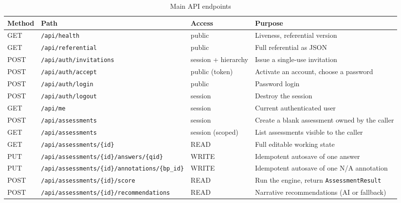 \begin{table}[ht!]
  \centering
  \begin{tabular}{@{}p{1.3cm}p{5.6cm}p{2.1cm}p{4.0cm}@{}}
    \toprule
    Method & Path & Access & Purpose \\
    \midrule
    GET & \texttt{/\allowbreak api/\allowbreak health} & public & Liveness, referential version \\
    GET & \texttt{/\allowbreak api/\allowbreak referential} & public & Full referential as JSON \\
    POST & \texttt{/\allowbreak api/\allowbreak auth/\allowbreak invitations} & session + hierarchy & Issue a single-use invitation \\
    POST & \texttt{/\allowbreak api/\allowbreak auth/\allowbreak accept} & public (token) & Activate an account, choose a password \\
    POST & \texttt{/\allowbreak api/\allowbreak auth/\allowbreak login} & public & Password login \\
    POST & \texttt{/\allowbreak api/\allowbreak auth/\allowbreak logout} & session & Destroy the session \\
    GET & \texttt{/\allowbreak api/\allowbreak me} & session & Current authenticated user \\
    POST & \texttt{/\allowbreak api/\allowbreak assessments} & session & Create a blank assessment owned by the caller \\
    GET & \texttt{/\allowbreak api/\allowbreak assessments} & session (scoped) & List assessments visible to the caller \\
    GET & \texttt{/\allowbreak api/\allowbreak assessments/\allowbreak \{id\}} & READ & Full editable working state \\
    PUT & \texttt{/\allowbreak api/\allowbreak assessments/\allowbreak \{id\}/\allowbreak answers/\allowbreak \{qid\}} & WRITE & Idempotent autosave of one answer \\
    PUT & \texttt{/\allowbreak api/\allowbreak assessments/\allowbreak \{id\}/\allowbreak annotations/\allowbreak \{bp\_\allowbreak id\}} & WRITE & Idempotent autosave of one N/A annotation \\
    POST & \texttt{/\allowbreak api/\allowbreak assessments/\allowbreak \{id\}/\allowbreak score} & READ & Run the engine, return \texttt{Assessment\allowbreak Result} \\
    POST & \texttt{/\allowbreak api/\allowbreak assessments/\allowbreak \{id\}/\allowbreak recommendations} & READ & Narrative recommendations (AI or fallback) \\
    \bottomrule
  \end{tabular}
  \caption{Main API endpoints}
  \label{tab:backend-api-endpoints}
\end{table}

